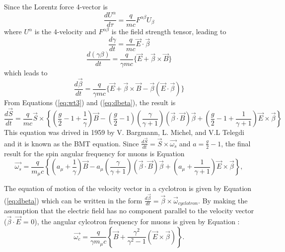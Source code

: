 \documentclass{outhesis}
\begin{document}
Since the Lorentz force 4-vector is 
\[
\frac{d U^{\alpha}}{d\tau} = \frac{q}{mc}F^{\alpha \beta}U_{\beta}
\]
where $U^{\alpha}$ is the 4-velocity and $F^{\alpha \beta}$ is the field strength tensor, leading to
\[
\frac{d \gamma}{dt} = \frac{q}{mc}\overrightarrow{E}\cdot\overrightarrow{\beta}
\]
\[
\frac{d \left(\gamma \beta\right)}{dt} = \frac{q}{\gamma mc}\{\overrightarrow{E} + \overrightarrow{\beta}\times\overrightarrow{B}\}
\]
which leads to 
\begin{equation}
\label{eq:dbeta}
\frac{d\overrightarrow{\beta}}{dt} = \frac{q}{\gamma mc}\{ \overrightarrow{E} + \overrightarrow{\beta}\times\overrightarrow{B}-\overrightarrow{\beta}\left(\overrightarrow{E}\cdot
\overrightarrow{\beta} \right)  \} 
\end{equation}
From Equations (\ref{eq:wt3}) and (\ref{eq:dbeta}), the result is 
\begin{equation}
\label{eq:dsf}
\frac{d \overrightarrow{S}}{dt} = \frac{q}{mc}\overrightarrow{S} \times \left\{\left(\frac{g}{2}-1 +\frac{1}{\gamma} \right)\overrightarrow{B}
-\left(\frac{g}{2}-1\right) \left(\frac{\gamma}{\gamma+1}\right)\left(\overrightarrow{\beta} \cdot \overrightarrow{B}\right)\overrightarrow{\beta}
+\left(\frac{g}{2}-1+\frac{1}{\gamma+1}\right)\overrightarrow{E}\times\overrightarrow{\beta}
\right\}
\end{equation}
This equation was drived in 1959 by V. Bargmann, L. Michel, and V.L Telegdi and it is known as the BMT equation. Since 
$
\frac{d \overrightarrow{S}}{dt} = \overrightarrow{S} \times \overrightarrow{\omega_s}
$
and $a = \frac{g}{2}-1$, the final result for the spin angular frequency for muons is Equation%
\begin{equation}
\label{eq:wbmt}
\overrightarrow{\omega_s} =  \frac{q}{m_{\mu}c}\left\{\left(a_{\mu} + \frac{1}{\gamma}\right)\overrightarrow{B}    -   a_{\mu}\left(\frac{\gamma}{\gamma + 1}\right)\left(\overrightarrow{\beta} \cdot \overrightarrow{B}\right)\overrightarrow{\beta}   +   \left(a_{\mu}+\frac{1}{\gamma + 1}\right)\overrightarrow{E} \times\overrightarrow{\beta}                 \right\},
\end{equation}

The equation of motion of the velocity vector in a cyclotron is given by Equation (\ref{eq:dbeta}) which can be written in the form $ \frac{d \overrightarrow{\beta}}{dt} = \overrightarrow{\beta} \times \overrightarrow{\omega}_{cyclotron}$.
By making the assumption that the electric field has no component parallel to the velocity vector ($\overrightarrow{\beta}\cdot\overrightarrow{E}$ = 0), the angular cylcotron frequency for muons is given 
by Equation %
: 
\begin{equation}
\overrightarrow{\omega_c} = \frac{q}{\gamma m_{\mu}c}\left\{\overrightarrow{B} + \frac{\gamma^2}{\gamma^2-1} \left(\overrightarrow{E} \times \overrightarrow{\beta}\right)\right\}.
\label{eq:c2}
\end{equation}
\end{document}
